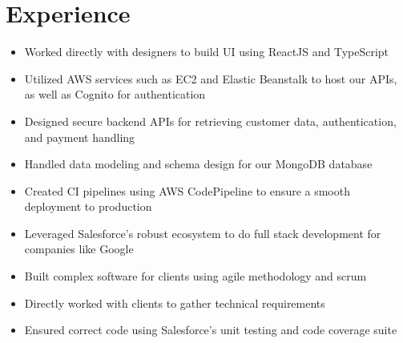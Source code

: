 \documentclass{cv}
\begin{document}
	\section{Experience}
	\begin{itemize}
		\item Worked directly with designers to build UI using ReactJS and TypeScript
		\item Utilized AWS services such as EC2 and Elastic Beanstalk to host our APIs, as well as Cognito for authentication
		\item Designed secure backend APIs for retrieving customer data, authentication, and payment handling
		\item Handled data modeling and schema design for our MongoDB database
		\item Created CI pipelines using AWS CodePipeline to ensure a smooth deployment to production
	\end{itemize}

	\begin{itemize}
		\item Leveraged Salesforce's robust ecosystem to do full stack development for companies like Google
		\item Built complex software for clients using agile methodology and scrum
		\item Directly worked with clients to gather technical requirements
		\item Ensured correct code using Salesforce's unit testing and code coverage suite
	\end{itemize}
\end{document}
